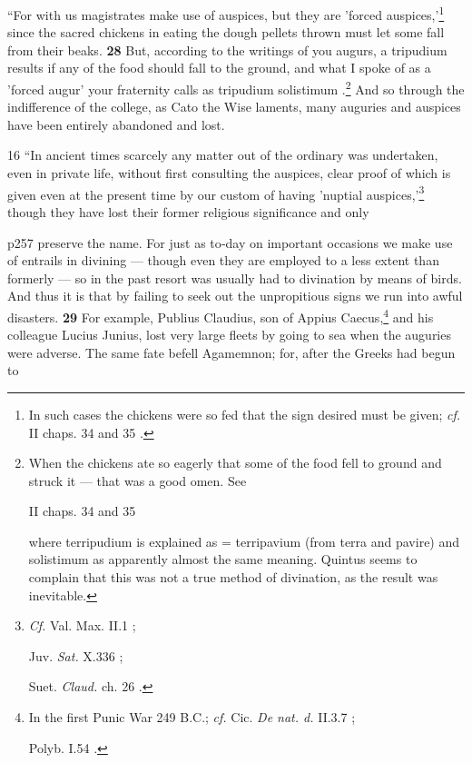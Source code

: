 ``For with us magistrates make use of auspices, but they are 'forced auspices,'\texthebrew{}\footnote{In such cases the chickens were so fed that the sign desired must be given; \emph{cf.} II chaps. 34 and 35 .

} since the sacred chickens in eating the dough pellets thrown must let some fall from their beaks. \textbf{28} But, according to the writings of you augurs, a tripudium results if any of the food should fall to the ground, and what I spoke of as a 'forced augur' your fraternity calls as tripudium solistimum .\texthebrew{}\footnote{When the chickens ate so eagerly that some of the food fell to ground and struck it \texthebrew{—} that was a good omen. See

II chaps. 34 and 35

where terripudium is explained as = terripavium (from terra and pavire) and solistimum as apparently almost the same meaning. Quintus seems to complain that this was not a true method of divination, as the result was inevitable.

} And so through the indifference of the college, as Cato the Wise laments, many auguries and auspices have been entirely abandoned and lost.

16
``In ancient times scarcely any matter out of the ordinary was undertaken, even in private life, without first consulting the auspices, clear proof of which is given even at the present time by our custom of having 'nuptial auspices,'\texthebrew{}\footnote{\emph{Cf.}
Val. Max. II.1 ;

Juv. \emph{Sat.} X.336 ;

Suet. \emph{Claud.} ch. 26 .

} though they have lost their former religious significance and only

p257 preserve the name. For just as to\texthebrew{‑}day on important occasions we make use of entrails in divining \texthebrew{—} though even they are employed to a less extent than formerly \texthebrew{—} so in the past resort was usually had to divination by means of birds. And thus it is that by failing to seek out the unpropitious signs we run into awful disasters. \textbf{29} For example, Publius Claudius, son of Appius Caecus,\texthebrew{}\footnote{In the first Punic War 249 B.C.; \emph{cf.} Cic. \emph{De nat. d.} II.3.7 ;

Polyb. I.54 .

} and his colleague Lucius Junius, lost very large fleets by going to sea when the auguries were adverse. The same fate befell Agamemnon; for, after the Greeks had begun to

